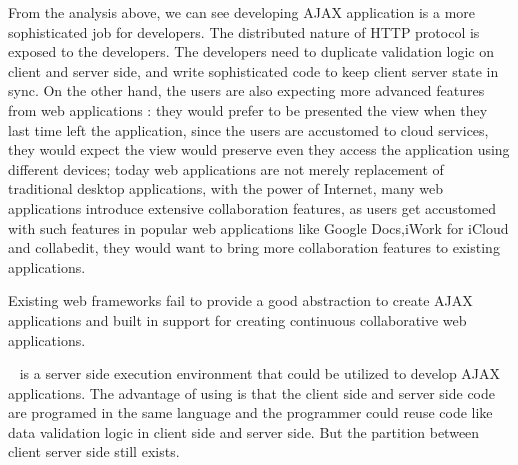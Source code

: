 From the analysis above,
we can see developing AJAX application is a more sophisticated job for developers.
The distributed nature of HTTP protocol is exposed to the developers.
The developers need to duplicate validation logic on client and server side,
and write sophisticated \js{} code to keep client server state in sync.
On the other hand, the users are also expecting more advanced features from web applications :
they would prefer to be presented the view when they last time left the application,
since the users are accustomed to cloud services,
they would expect the view would preserve even they access the application
using different devices;
today web applications are not merely replacement of traditional desktop applications,
with the power of Internet,
many web applications introduce extensive collaboration features,
as users get accustomed with such features in popular web applications
like Google Docs,iWork for iCloud and collabedit,
they would want to bring more collaboration features to existing applications.

Existing web frameworks fail to provide a good abstraction to create
AJAX applications and built in support for creating
continuous collaborative web applications.

\nodejs{}~\cite{tilkov2010node} is a server side \js{} execution environment
that could be utilized to develop AJAX applications.
The advantage of using \nodejs{} is that the client side and server side code are programed in
the same language and
the programmer could reuse code like data validation logic in client side and server side.
But the partition between client server side still exists.





